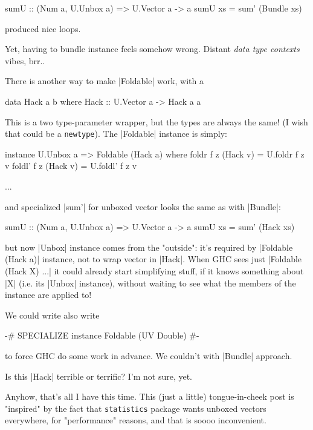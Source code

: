 \begin{code}
sumU :: (Num a, U.Unbox a) => U.Vector a -> a
sumU xs = sum' (Bundle xs)
\end{code}

produced nice loops.

Yet, having to bundle instance feels somehow wrong.
Distant \emph{data type contexts} vibes, brr..

There is another way to make |Foldable| work, with a

\begin{code}
data Hack a b where
    Hack :: U.Vector a -> Hack a a
\end{code}

This is a two type-parameter wrapper, but the types are always the same!
(I wish that could be a \texttt{newtype}).
The |Foldable| instance is simply:

\begin{code}
instance U.Unbox a => Foldable (Hack a) where
    foldr f z (Hack v)  = U.foldr f z v
    foldl' f z (Hack v) = U.foldl' f z v

    ...
\end{code}

and specialized |sum'| for unboxed vector looks the same as with |Bundle|:

\begin{code}
sumU :: (Num a, U.Unbox a) => U.Vector a -> a
sumU xs = sum' (Hack xs)
\end{code}

but now |Unbox| instance comes from the "outside": it's required by |Foldable (Hack a)| instance,
not to wrap vector in |Hack|.
When GHC sees just |Foldable (Hack X) ...| it could already start simplifying
stuff, if it knows something about |X| (i.e. its |Unbox| instance),
without waiting to see what the members of the instance are applied to!

We could write also write

\begin{code}
{-# SPECIALIZE instance Foldable (UV Double) #-}
\end{code}

to force GHC do some work in advance. We couldn't with |Bundle| approach.

Is this |Hack| terrible or terrific? I'm not sure, yet.

Anyhow, that's all I have this time.
This (just a little) tongue-in-cheek post is "inspired" by the fact
that \texttt{statistics} package wants unboxed vectors everywhere,
for "performance" reasons, and that is soooo inconvenient.

